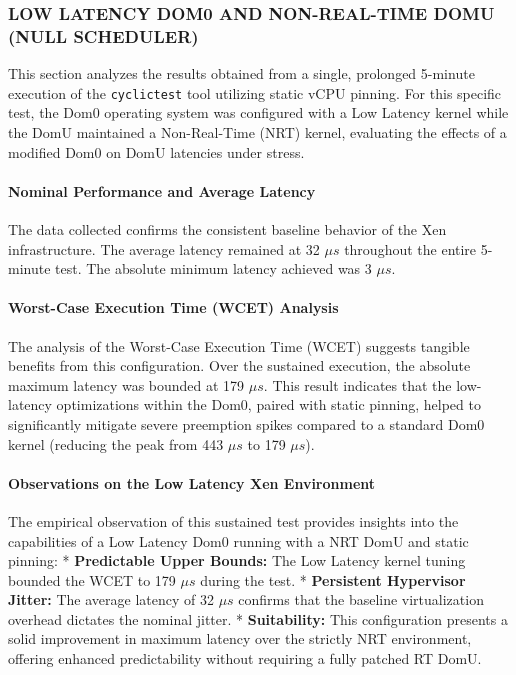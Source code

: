 \subsubsection{LOW LATENCY DOM0 AND NON-REAL-TIME DOMU (NULL
SCHEDULER)}\label{low-latency-dom0-and-non-real-time-domu-null-scheduler-1}

This section analyzes the results obtained from a single, prolonged
5-minute execution of the \texttt{cyclictest} tool utilizing static vCPU
pinning. For this specific test, the Dom0 operating system was
configured with a Low Latency kernel while the DomU maintained a
Non-Real-Time (NRT) kernel, evaluating the effects of a modified Dom0 on
DomU latencies under stress.

\paragraph{Nominal Performance and Average
Latency}\label{nominal-performance-and-average-latency-21}

The data collected confirms the consistent baseline behavior of the Xen
infrastructure. The average latency remained at 32 $\mu s$ throughout the
entire 5-minute test. The absolute minimum latency achieved was 3 $\mu s$.

\paragraph{Worst-Case Execution Time (WCET)
Analysis}\label{worst-case-execution-time-wcet-analysis-23}

The analysis of the Worst-Case Execution Time (WCET) suggests tangible
benefits from this configuration. Over the sustained execution, the
absolute maximum latency was bounded at 179 $\mu s$. This result indicates
that the low-latency optimizations within the Dom0, paired with static
pinning, helped to significantly mitigate severe preemption spikes
compared to a standard Dom0 kernel (reducing the peak from 443 $\mu s$ to 179
$\mu s$).

\paragraph{Observations on the Low Latency Xen
Environment}\label{observations-on-the-low-latency-xen-environment-3}

The empirical observation of this sustained test provides insights into
the capabilities of a Low Latency Dom0 running with a NRT DomU and
static pinning: * \textbf{Predictable Upper Bounds:} The Low Latency
kernel tuning bounded the WCET to 179 $\mu s$ during the test. *
\textbf{Persistent Hypervisor Jitter:} The average latency of 32 $\mu s$
confirms that the baseline virtualization overhead dictates the nominal
jitter. * \textbf{Suitability:} This configuration presents a solid
improvement in maximum latency over the strictly NRT environment,
offering enhanced predictability without requiring a fully patched RT
DomU.

